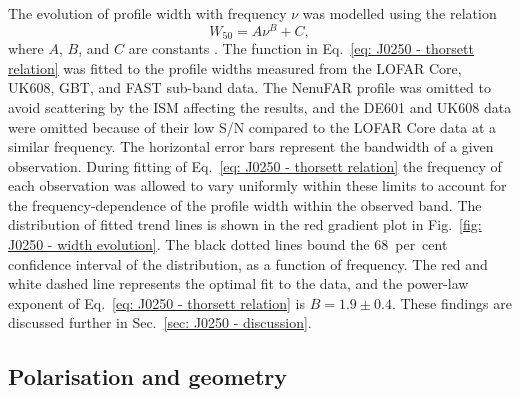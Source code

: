 The evolution of profile width with frequency $\nu$ was modelled using the relation
\begin{equation}
\label{eq: J0250 - thorsett relation}
    W_{50} = A\nu^B + C,
\end{equation}
where $A$, $B$, and $C$ are constants \citep{Txxx1991, CWxx2014}. The function in Eq.~\eqref{eq: J0250 - thorsett relation} was fitted to the profile widths measured from the LOFAR Core, UK608, GBT, and FAST sub-band data. The NenuFAR profile was omitted to avoid scattering by the ISM affecting the results, and the DE601 and UK608 data were omitted because of their low S/N compared to the LOFAR Core data at a similar frequency. The horizontal error bars represent the bandwidth of a given observation. During fitting of Eq.~\eqref{eq: J0250 - thorsett relation} the frequency of each observation was allowed to vary uniformly within these limits to account for the frequency-dependence of the profile width within the observed band. The distribution of fitted trend lines is shown in the red gradient plot in Fig.~\ref{fig: J0250 - width evolution}. The black dotted lines bound the 68~per~cent confidence interval of the distribution, as a function of frequency. The red and white dashed line represents the optimal fit to the data, and the power-law exponent of Eq.~\eqref{eq: J0250 - thorsett relation} is $B = 1.9 \pm 0.4$. These findings are discussed further in Sec.~\ref{sec: J0250 - discussion}.







\subsection{Polarisation and geometry}
\label{sec: J0250 - analysis - polarisation and geometry}

